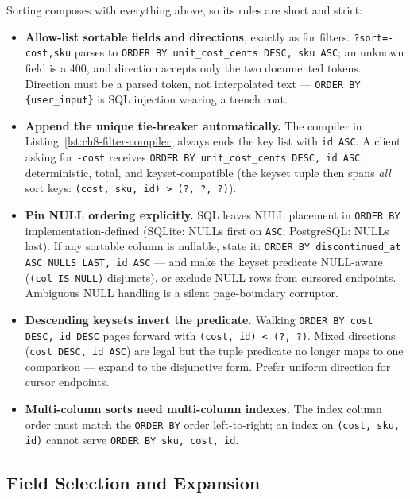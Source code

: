 Sorting composes with everything above, so its rules are short and strict:

\begin{itemize}
  \item \textbf{Allow-list sortable fields and directions}, exactly as for
        filters. \texttt{?sort=-cost,sku} parses to
        \texttt{ORDER BY unit\_cost\_cents DESC, sku ASC}; an unknown field
        is a 400, and direction accepts only the two documented tokens.
        Direction must be a parsed token, not interpolated text ---
        \texttt{ORDER BY \{user\_input\}} is SQL injection wearing a trench
        coat.
  \item \textbf{Append the unique tie-breaker automatically.} The compiler
        in Listing~\ref{lst:ch8-filter-compiler} always ends the key list
        with \texttt{id ASC}. A client asking for \texttt{-cost} receives
        \texttt{ORDER BY unit\_cost\_cents DESC, id ASC}: deterministic,
        total, and keyset-compatible (the keyset tuple then spans
        \emph{all} sort keys: \texttt{(cost, sku, id) > (?, ?, ?)}).
  \item \textbf{Pin NULL ordering explicitly.} SQL leaves NULL placement in
        \texttt{ORDER BY} implementation-defined (SQLite: NULLs first on
        \texttt{ASC}; PostgreSQL: NULLs last). If any sortable column is
        nullable, state it: \texttt{ORDER BY discontinued\_at ASC NULLS
        LAST, id ASC} --- and make the keyset predicate NULL-aware
        (\texttt{(col IS NULL)} disjuncts), or exclude NULL rows from
        cursored endpoints. Ambiguous NULL handling is a silent
        page-boundary corruptor.
  \item \textbf{Descending keysets invert the predicate.} Walking
        \texttt{ORDER BY cost DESC, id DESC} pages forward with
        \texttt{(cost, id) < (?, ?)}. Mixed directions
        (\texttt{cost DESC, id ASC}) are legal but the tuple predicate no
        longer maps to one comparison --- expand to the disjunctive form.
        Prefer uniform direction for cursor endpoints.
  \item \textbf{Multi-column sorts need multi-column indexes.} The index
        column order must match the \texttt{ORDER BY} order left-to-right;
        an index on \texttt{(cost, sku, id)} cannot serve
        \texttt{ORDER BY sku, cost, id}.
\end{itemize}

\subsection{Field Selection and Expansion}
\label{subsec:ch8-field-selection}

